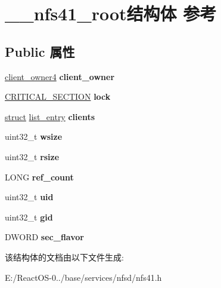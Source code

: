 \hypertarget{struct____nfs41__root}{}\section{\+\_\+\+\_\+nfs41\+\_\+root结构体 参考}
\label{struct____nfs41__root}
\subsection*{Public 属性}
\begin{DoxyCompactItemize}
\item 
\mbox{\label{struct____nfs41__root_accb19c2060d88d56b921638e6b9c0ed5}} 
\hyperlink{struct____client__owner4}{client\+\_\+owner4} {\bfseries client\+\_\+owner}
\item 
\mbox{\label{struct____nfs41__root_a5dd3f849fa10c29e47f5a666e8853701}} 
\hyperlink{struct___c_r_i_t_i_c_a_l___s_e_c_t_i_o_n}{C\+R\+I\+T\+I\+C\+A\+L\+\_\+\+S\+E\+C\+T\+I\+ON} {\bfseries lock}
\item 
\mbox{\label{struct____nfs41__root_aca8b8b09187dc1f62b5db667df643ae0}} 
\hyperlink{interfacestruct}{struct} \hyperlink{structlist__entry}{list\+\_\+entry} {\bfseries clients}
\item 
\mbox{\label{struct____nfs41__root_a30fea60341f93c4b4ab261b110f627f1}} 
uint32\+\_\+t {\bfseries wsize}
\item 
\mbox{\label{struct____nfs41__root_adcc6672a9473a44d8b3ac0f6e9029986}} 
uint32\+\_\+t {\bfseries rsize}
\item 
\mbox{\label{struct____nfs41__root_ae2c3689fd5dd2888ac3b57c942061df2}} 
L\+O\+NG {\bfseries ref\+\_\+count}
\item 
\mbox{\label{struct____nfs41__root_aab85ffa5369f1fa6aa2c5c25451a8193}} 
uint32\+\_\+t {\bfseries uid}
\item 
\mbox{\label{struct____nfs41__root_a8e5d42ece3ca1d095caeaa675f534c3d}} 
uint32\+\_\+t {\bfseries gid}
\item 
\mbox{\label{struct____nfs41__root_aec75314793a2d444eaac778d19cf4b08}} 
D\+W\+O\+RD {\bfseries sec\+\_\+flavor}
\end{DoxyCompactItemize}


该结构体的文档由以下文件生成\+:\begin{DoxyCompactItemize}
\item 
E\+:/\+React\+O\+S-\/0../base/services/nfsd/nfs41.\+h\end{DoxyCompactItemize}
